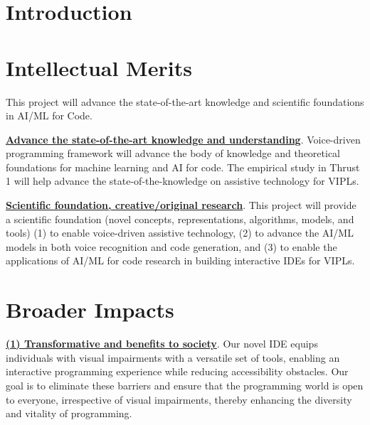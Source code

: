 \section{Introduction}\label{sec:intro}



%





\section{Intellectual Merits}

This project will advance the state-of-the-art
knowledge and scientific foundations in AI/ML for Code.

\noindent \underline{{\bf Advance the state-of-the-art knowledge and
    understanding}}. Voice-driven programming framework will advance
the body of knowledge and theoretical foundations for machine learning
and AI for code. The empirical study in Thrust 1 will help advance the
state-of-the-knowledge on assistive technology for VIPLs.

\noindent \underline{{\bf Scientific foundation, creative/original
    research}}. This project will provide a scientific foundation
(novel concepts, representations, algorithms, models, and tools) (1)
to enable voice-driven assistive technology, (2) to advance the AI/ML
models in both voice recognition and code generation, and (3) to
enable the applications of AI/ML for code research in building
interactive IDEs for VIPLs.

\section{Broader Impacts}

\underline{{\bf (1) Transformative and benefits to society}}.  Our
novel IDE equips individuals with visual
impairments with a versatile set of tools,
enabling an interactive programming experience while reducing
accessibility obstacles. Our goal is to eliminate these barriers and
ensure that the programming world is open to everyone, irrespective of
visual impairments, thereby enhancing the diversity and vitality of
programming.


